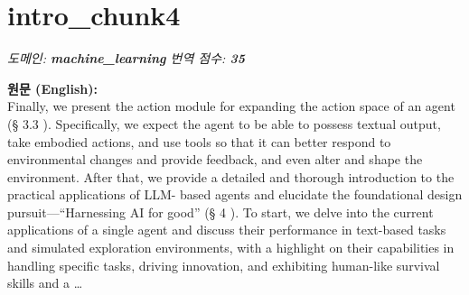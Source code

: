 \documentclass[12pt,a4paper]{article}
\begin{document}
\section{intro\_chunk4}
\noindent\textit{\small 도메인: \textbf{machine\_learning} \quad 번역 점수: \textbf{\color{red!70!black}35}}
\vspace{0.5em}

\begin{mdframed}[style=orig]
\noindent\textbf{\small 원문 (English):}\\[2pt]
\small Finally, we present the action module for expanding the action space of an agent (§ 3.3 ). Specifically, we expect the agent to be able to possess textual output, take embodied actions, and use tools so that it can better respond to environmental changes and provide feedback, and even alter and shape the environment. After that, we provide a detailed and thorough introduction to the practical applications of LLM- based agents and elucidate the foundational design pursuit—“Harnessing AI for good” (§ 4 ). To start, we delve into the current applications of a single agent and discuss their performance in text-based tasks and simulated exploration environments, with a highlight on their capabilities in handling specific tasks, driving innovation, and exhibiting human-like survival skills and a \ldots
\end{mdframed}
\vspace{0.4em}
\end{document}
